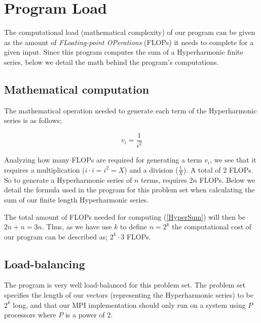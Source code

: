 \documentclass[fontsize=11pt,paper=a4,titlepage]{report}
\begin{document}



\section{Program Load}

The computational load (mathematical complexity) of our program can be given as
the amount of \textit{FLoating-point OPerations} (FLOPs) it needs to complete
for a given input. Since this program computes the sum of a Hyperharmonic finite
series, below we detail the math behind the program's computations.

\subsection{Mathematical computation}

The mathematical operation needed to generate each term of the Hyperharmonic
series is as follows;

\begin{equation}
	v_i = \frac{1}{i^2}
\end{equation}

Analyzing how many FLOPs are required for generating a term $v_i$, we see that
it requires a multiplication ($i\cdot i = i^2 = X$) and a division
($\frac{1}{X}$). A total of 2 FLOPs. So to generate a Hyperharmonic series of
$n$ terms, requires $2n$ FLOPs. Below we detail the formula used in the program
for this problem set when calculating the sum of our finite length Hyperharmonic
series.

The total amount of FLOPs needed for computing (\ref{HyperSum}) will then be $2n + n = 3n$.
Thus, as we have use $k$ to define $n=2^k$ the computational cost of our program
can be described as; $2^k\cdot 3$ FLOPs.

\subsection{Load-balancing}

The program is very well load-balanced for this problem set. The problem set
specifies the length of our vectors (representing the Hyperharmonic series) to
be $2^k$ long, and that our MPI implementation should only run on a system using
$P$ processors where $P$ is a power of 2.
\end{document}
